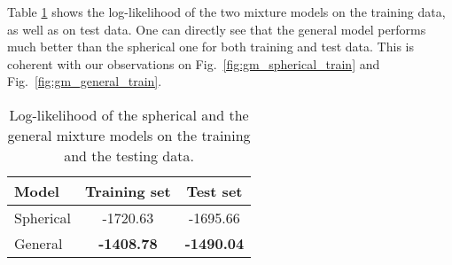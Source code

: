 \documentclass{article}
\begin{document}
Table \ref{tb:gm} shows the log-likelihood of the two mixture models on the training data, as well as on test data. One can directly see that the general model performs much better than the spherical one for both training and test data. This is coherent with our observations on Fig.~\ref{fig:gm_spherical_train} and Fig.~\ref{fig:gm_general_train}.

\begin{table}[ht!]
\centering
\begin{tabular}{|l|c|c|}
\hline
Model & Training set & Test set\\
\hline
Spherical & -1720.63 & -1695.66 \\
\hline
General & \textbf{-1408.78} & \textbf{-1490.04} \\
\hline
\end{tabular}
\caption{Log-likelihood of the spherical and the general mixture models on the training and the testing data.}
\label{tb:gm}
\end{table}
\end{document}

